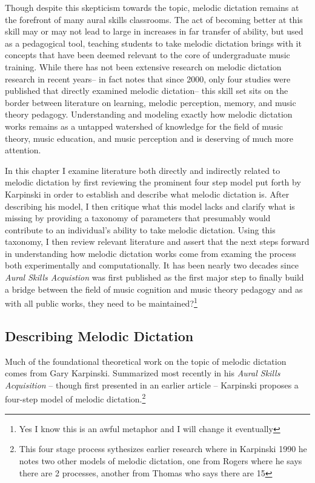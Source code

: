 \documentclass[]{book}
\let\rmarkdownfootnote\footnote%
\def\footnote{\protect\rmarkdownfootnote}
\theoremstyle{definition}
\theoremstyle{definition}
\theoremstyle{definition}
\theoremstyle{remark}
\begin{document}
Though despite this skepticism towards the topic, melodic dictation
remains at the forefront of many aural skills classrooms. The act of
becoming better at this skill may or may not lead to large in increases
in far transfer of ability, but used as a pedagogical tool, teaching
students to take melodic dictation brings with it concepts that have
been deemed relevant to the core of undergraduate music training. While
there has not been extensive research on melodic dictation research in
recent years-- in fact \citet{paneyEffectDirectingAttention2016} notes
that since 2000, only four studies were published that directly examined
melodic dictation-- this skill set sits on the border between literature
on learning, melodic perception, memory, and music theory pedagogy.
Understanding and modeling exactly how melodic dictation works remains
as a untapped watershed of knowledge for the field of music theory,
music education, and music perception and is deserving of much more
attention.

In this chapter I examine literature both directly and indirectly
related to melodic dictation by first reviewing the prominent four step
model put forth by Karpinski in order to establish and describe what
melodic dictation is. After describing his model, I then critique what
this model lacks and clarify what is missing by providing a taxonomy of
parameters that presumably would contribute to an individual's ability
to take melodic dictation. Using this taxonomy, I then review relevant
literature and assert that the next steps forward in understanding how
melodic dictation works come from examing the process both
experimentally and computationally. It has been nearly two decades since
\emph{Aural Skills Acquistion} was first published as the first major
step to finally build a bridge between the field of music cognition and
music theory pedagogy
\citep{davidbutlerWhyGulfMusic1997a, karpinskiAuralSkillsAcquisition2000, klonoskiPerceptualLearningHierarchy2000}
and as with all public works, they need to be maintained?\footnote{Yes I
  know this is an awful metaphor and I will change it eventually}

\hypertarget{describing-melodic-dictation}{%
\subsection{Describing Melodic
Dictation}\label{describing-melodic-dictation}}

Much of the foundational theoretical work on the topic of melodic
dictation comes from Gary Karpinski. Summarized most recently in his
\emph{Aural Skills Acquisition}
\citep{karpinskiAuralSkillsAcquisition2000}-- though first presented in
an earlier article \citep{karpinskiModelMusicPerception1990}-- Karpinski
proposes a four-step model of melodic dictation.\footnote{This four
  stage process sythesizes earlier research where in Karpinski 1990 he
  notes two other models of melodic dictation, one from Rogers where he
  says there are 2 processes, another from Thomas who says there are 15}
\end{document}
